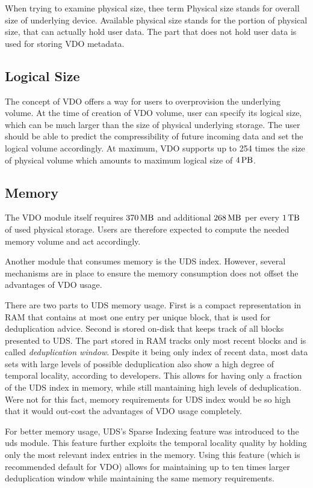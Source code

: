 \documentclass[
  color, %
  table, %
  lof,   %
  lot,   %
]{fithesis3}
\begin{document}
When trying to examine physical size, thee term Physical size stands for overall size of underlying device. Available physical size stands for the portion of physical size, that can actually hold user data. The part that does not hold user data is used for storing VDO metadata.

\subsection{Logical Size}
The concept of VDO offers a way for users to overprovision the underlying volume. At the time of creation of VDO volume, user can specify its logical size, which can be much larger than the size of physical underlying storage. The user should be able to predict the compressibility of future incoming data and set the logical volume accordingly. At maximum, VDO supports up to 254 times the size of physical volume which amounts to maximum logical size of $\SI{4}{\peta\byte}$.

\subsection{Memory}
The VDO module itself requires $\SI{370}{\mega\byte}$ and additional $\SI{268}{\mega\byte}$ per every $\SI{1}{\tera\byte}$ of used physical storage. Users are therefore expected to compute the needed memory volume and act accordingly.

Another module that consumes memory is the UDS index. However, several mechanisms are in place to ensure the memory consumption does not offset the advantages of VDO usage.

There are two parts to UDS memory usage. First is a compact representation in RAM that contains at most one entry per unique block, that is used for deduplication advice. Second is stored on-disk that keeps track of all blocks presented to UDS. The part stored in RAM tracks only most recent blocks and is called \emph{deduplication window}. Despite it being only index of recent data, most data sets with large levels of possible deduplication also show a high degree of temporal locality, according to developers. This allows for having only a fraction of the UDS index in memory, while still mantaining high levels of deduplication. Were not for this fact, memory requirements for UDS index would be so high that it would out-cost the advantages of VDO usage completely.

For better memory usage, UDS's Sparse Indexing feature was introduced to the uds module. This feature further exploits the temporal locality quality by holding only the most relevant index entries in the memory. Using this feature (which is recommended default for VDO) allows for maintaining up to ten times larger deduplication window while maintaining the same memory requirements.
\end{document}
